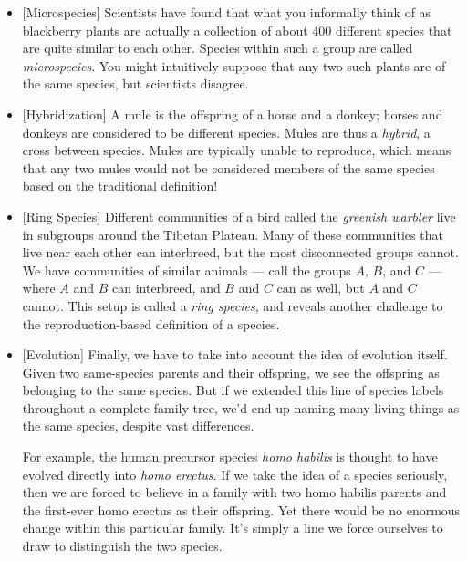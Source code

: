 \documentclass[9pt, twoside]{book}
\theoremstyle{argtstyle}
\begin{document}
\begin{itemize}
    \item{} [Microspecies] Scientists have found that what you informally
        think of as blackberry plants are actually a
        collection of about 400
        different species that are quite similar to each other.
        Species within such a group are called {\em microspecies}.
        You might intuitively
        suppose that any two such plants are of the same species,
        but scientists disagree.
    \item{} [Hybridization] A mule is the offspring of a horse and a donkey;
        horses and donkeys are considered to be different species.
        Mules are thus a {\em hybrid}, a cross between species.
        Mules are typically unable to reproduce, which means that
        any two mules would not be considered members of the same
        species based on the traditional definition!
    \item{} [Ring Species] Different communities of a bird called the
        {\em greenish warbler} live in subgroups around the Tibetan Plateau.
        Many of these communities that live near each other can interbreed, but
        the most disconnected groups cannot. We have
        communities of similar animals --- call the groups $A$, $B$, and $C$ ---
        where $A$ and $B$ can interbreed, and $B$ and $C$ can as well, but $A$
        and $C$ cannot. This setup is called a {\em ring species}, and reveals
        another challenge to the reproduction-based definition of a species.
    \item{} [Evolution] Finally, we have to take into account the idea of
        evolution itself.
        Given two same-species parents and their offspring, we see the
        offspring as belonging to the same species.
        But if we extended this line of
        species labels throughout a complete family tree, we'd end up naming
        many living things as the same species, despite vast differences.

        For example, the human precursor species {\em homo habilis} is
        thought to have evolved directly into {\em homo erectus}.
        If we take the idea of a species seriously,
        then we are forced to believe in a family
        with two homo habilis parents and
        the first-ever homo erectus as their offspring.
        Yet there would be no enormous
        change within this particular family.
        It's simply a line we force
        ourselves to draw to distinguish the two species.
\end{itemize}
\end{document}
